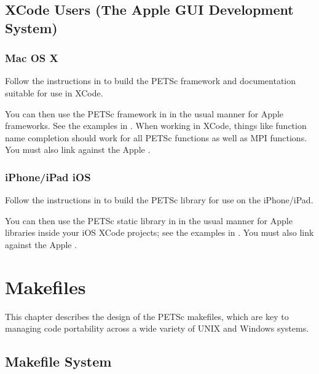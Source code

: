{{\section{XCode Users (The Apple GUI Development System)} 
\subsection{Mac OS X}

Follow the instructions in  to build the PETSc framework and documentation suitable for use in XCode.

You can then use the PETSc framework in  in the usual manner for Apple frameworks.
See the examples in .  When working in XCode, things like function name completion should work for all PETSc functions as well as MPI functions. You must also link against the Apple .

\subsection{iPhone/iPad iOS}

Follow the instructions in  to build the PETSc library for use on the iPhone/iPad.

You can then use the PETSc static library in  in the usual manner for Apple libraries inside your iOS XCode projects; see the examples in .  You must also link against the Apple .

\cleardoublepage
\chapter{Makefiles}
\label{ch_makefiles}

This chapter describes the design of the PETSc makefiles, which are
key to managing code portability across a wide variety of UNIX and Windows systems.

\section{Makefile System}

}}
